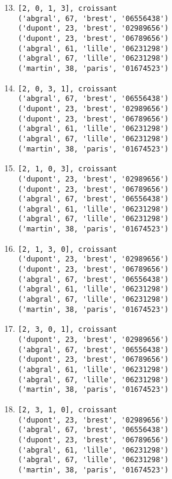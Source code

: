 \documentclass[11pt,a4paper]{article}
\begin{document}
\noindent
\begin{minipage}[t]{7cm}\footnotesize
\begin{enumerate}\setcounter{enumi}{12}
\item \begin{Verbatim}
[2, 0, 1, 3], croissant
('abgral', 67, 'brest', '06556438')
('dupont', 23, 'brest', '02989656')
('dupont', 23, 'brest', '06789656')
('abgral', 61, 'lille', '06231298')
('abgral', 67, 'lille', '06231298')
('martin', 38, 'paris', '01674523')
\end{Verbatim}

\item \begin{Verbatim}
[2, 0, 3, 1], croissant
('abgral', 67, 'brest', '06556438')
('dupont', 23, 'brest', '02989656')
('dupont', 23, 'brest', '06789656')
('abgral', 61, 'lille', '06231298')
('abgral', 67, 'lille', '06231298')
('martin', 38, 'paris', '01674523')
\end{Verbatim}

\item \begin{Verbatim}
[2, 1, 0, 3], croissant
('dupont', 23, 'brest', '02989656')
('dupont', 23, 'brest', '06789656')
('abgral', 67, 'brest', '06556438')
('abgral', 61, 'lille', '06231298')
('abgral', 67, 'lille', '06231298')
('martin', 38, 'paris', '01674523')
\end{Verbatim}

\item \begin{Verbatim}
[2, 1, 3, 0], croissant
('dupont', 23, 'brest', '02989656')
('dupont', 23, 'brest', '06789656')
('abgral', 67, 'brest', '06556438')
('abgral', 61, 'lille', '06231298')
('abgral', 67, 'lille', '06231298')
('martin', 38, 'paris', '01674523')
\end{Verbatim}

\item \begin{Verbatim}
[2, 3, 0, 1], croissant
('dupont', 23, 'brest', '02989656')
('abgral', 67, 'brest', '06556438')
('dupont', 23, 'brest', '06789656')
('abgral', 61, 'lille', '06231298')
('abgral', 67, 'lille', '06231298')
('martin', 38, 'paris', '01674523')
\end{Verbatim}

\item \begin{Verbatim}
[2, 3, 1, 0], croissant
('dupont', 23, 'brest', '02989656')
('abgral', 67, 'brest', '06556438')
('dupont', 23, 'brest', '06789656')
('abgral', 61, 'lille', '06231298')
('abgral', 67, 'lille', '06231298')
('martin', 38, 'paris', '01674523')
\end{Verbatim}
\end{enumerate}
\end{minipage}
\end{document}
